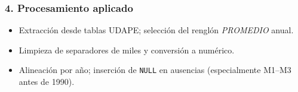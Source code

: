 \documentclass[12pt,a4paper]{article}
\begin{document}
\subsubsection*{4. Procesamiento aplicado}
\begin{itemize}
  \item Extracción desde tablas UDAPE; selección del renglón \emph{PROMEDIO} anual.
  \item Limpieza de separadores de miles y conversión a numérico.
  \item Alineación por año; inserción de \texttt{NULL} en ausencias (especialmente M1--M3 antes de 1990).
\end{itemize}
\end{document}
